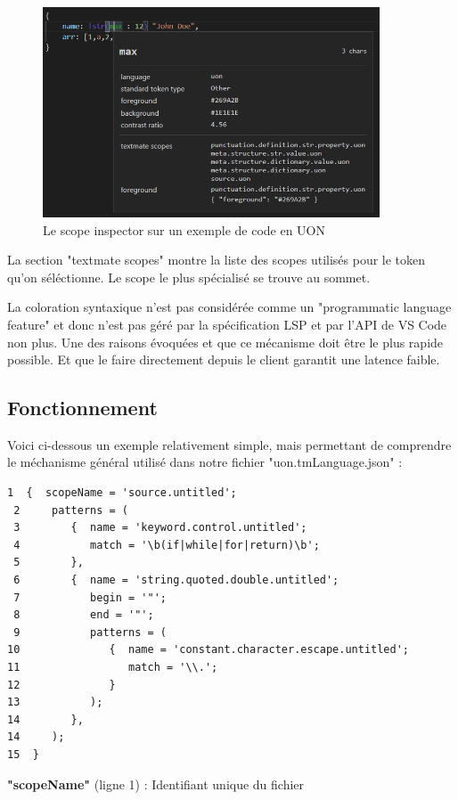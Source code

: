 \documentclass[
    iict, %
    il, %
]{heig-tb}
\begin{document}
\begin{figure}[!h]
    \begin{center}
        \includegraphics[width=10cm]{assets/figures/scope-inspector.png}
    \end{center}
    \caption[Scope inspector]{\label{basic-uon} Le scope inspector sur un exemple de code en UON}
\end{figure}

La section "textmate scopes" montre la liste des scopes utilisés pour le token qu'on séléctionne. Le scope le plus spécialisé se trouve au sommet.

La coloration syntaxique n'est pas considérée comme un "programmatic language feature" et donc n'est pas géré par la spécification LSP et par l'API de VS Code non plus.
Une des raisons évoquées et que ce mécanisme doit être le plus rapide possible. Et que le faire directement depuis le client garantit une latence faible.

\subsection{Fonctionnement}

Voici ci-dessous un exemple relativement simple, mais permettant de comprendre le méchanisme général utilisé dans notre fichier "uon.tmLanguage.json" :
\begin{lstlisting}[frame=single, caption={Textmate grammar},label={Textmate grammar}]
 1  {  scopeName = 'source.untitled';
 2     patterns = (
 3        {  name = 'keyword.control.untitled';
 4           match = '\b(if|while|for|return)\b';
 5        },
 6        {  name = 'string.quoted.double.untitled';
 7           begin = '"';
 8           end = '"';
 9           patterns = (
10              {  name = 'constant.character.escape.untitled';
11                 match = '\\.';
12              }
13           );
14        },
14     );
15  }
\end{lstlisting}
\textbf{"scopeName"} (ligne 1) : Identifiant unique du fichier
\end{document}
